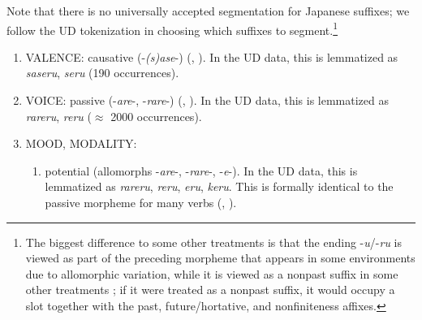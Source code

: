 \documentclass[11pt,letterpaper]{article}
\begin{document}
Note that there  is no universally accepted segmentation for Japanese suffixes; we follow the UD tokenization in choosing which suffixes to segment.\footnote{The biggest difference to some other treatments is that the ending -\textit{u}/-\textit{ru} is viewed as part of the preceding morpheme that appears in some environments due to allomorphic variation, while it is viewed as a nonpast suffix in some other treatments \citep[p.116]{hasegawa2014japanese}; if it were treated as a nonpast suffix, it would occupy a slot together with the past, future/hortative, and nonfiniteness affixes.}



\begin{enumerate}
	\item VALENCE: causative (-\textit{(s)ase}-) (\citet[142]{hasegawa2014japanese}, \citet[Chapter 13]{kaiser2013japanese}). In the UD data, this is lemmatized as \textit{saseru}, \textit{seru} (190 occurrences).
	\item VOICE: passive (-\textit{are}-, -\textit{rare}-) (\citet[152]{hasegawa2014japanese}, \citet[Chapter 12]{kaiser2013japanese}).  In the UD data, this is lemmatized as \textit{rareru}, \textit{reru} ($\approx$ 2000 occurrences).
\item MOOD, MODALITY:
\begin{enumerate}
\item potential (allomorphs -\textit{are}-, -\textit{rare}-, -\textit{e}-). In the UD data, this is lemmatized as \textit{rareru}, \textit{reru}, \textit{eru}, \textit{keru}.
This is formally identical to the passive morpheme for many verbs (\citet[346]{vaccari1938complete}, \citet[398]{kaiser2013japanese}).




\end{enumerate}
\end{enumerate}
\end{document}
